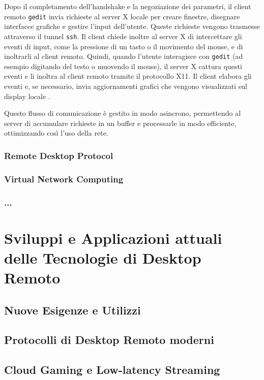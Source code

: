 \documentclass[12pt,a4paper,openright,twoside]{book}
\begin{document}
Dopo il completamento dell'handshake e la negoziazione dei parametri, il client remoto \texttt{gedit} invia richieste al server X locale per creare finestre, disegnare interfacce grafiche e gestire l'input dell'utente. Queste richieste vengono trasmesse attraverso il tunnel \texttt{ssh}. Il client chiede inoltre al server X di intercettare gli eventi di input, come la pressione di un tasto o il movimento del mouse, e di inoltrarli al client remoto. Quindi, quando l'utente interagisce con \texttt{gedit} (ad esempio digitando del testo o muovendo il mouse), il server X cattura questi eventi e li inoltra al client remoto tramite il protocollo X11. Il client elabora gli eventi e, se necessario, invia aggiornamenti grafici che vengono visualizzati sul display locale \cite{coopersmith2024x}.

Questo flusso di comunicazione è gestito in modo asincrono, permettendo al server di accumulare richieste in un buffer e processarle in modo efficiente, ottimizzando così l'uso della rete.




\subsection{Remote Desktop Protocol}

\subsection{Virtual Network Computing}

\subsection{...}

\chapter{Sviluppi e Applicazioni attuali delle Tecnologie di Desktop Remoto}

\section{Nuove Esigenze e Utilizzi}

\section{Protocolli di Desktop Remoto moderni}

\section{Cloud Gaming e Low-latency Streaming}
\end{document}
